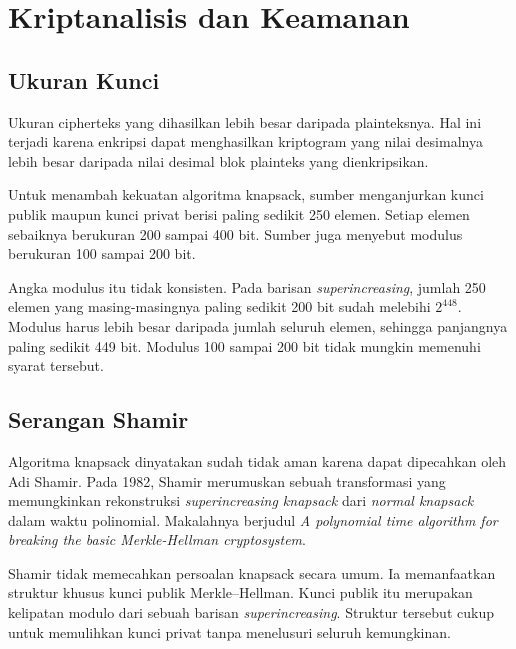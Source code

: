 \section{Kriptanalisis dan Keamanan}
\label{sec:kriptanalisis-knapsack}

\subsection{Ukuran Kunci}

Ukuran cipherteks yang dihasilkan lebih besar daripada plainteksnya. Hal ini
terjadi karena enkripsi dapat menghasilkan kriptogram yang nilai desimalnya
lebih besar daripada nilai desimal blok plainteks yang dienkripsikan.

Untuk menambah kekuatan algoritma knapsack, sumber menganjurkan kunci publik
maupun kunci privat berisi paling sedikit 250 elemen. Setiap elemen sebaiknya
berukuran 200 sampai 400 bit. Sumber juga menyebut modulus berukuran 100 sampai
200 bit.

Angka modulus itu tidak konsisten. Pada barisan \textit{superincreasing},
jumlah 250 elemen yang masing-masingnya paling sedikit 200 bit sudah melebihi
$2^{448}$. Modulus harus lebih besar daripada jumlah seluruh elemen, sehingga
panjangnya paling sedikit 449 bit. Modulus 100 sampai 200 bit tidak mungkin
memenuhi syarat tersebut.

\subsection{Serangan Shamir}

Algoritma knapsack dinyatakan sudah tidak aman karena dapat dipecahkan oleh
Adi Shamir. Pada 1982, Shamir merumuskan sebuah transformasi yang memungkinkan
rekonstruksi \textit{superincreasing knapsack} dari \textit{normal knapsack}
dalam waktu polinomial. Makalahnya berjudul \textit{A polynomial time algorithm
for breaking the basic Merkle-Hellman cryptosystem}.

Shamir tidak memecahkan persoalan knapsack secara umum. Ia memanfaatkan struktur
khusus kunci publik Merkle--Hellman. Kunci publik itu merupakan kelipatan
modulo dari sebuah barisan \textit{superincreasing}. Struktur tersebut cukup
untuk memulihkan kunci privat tanpa menelusuri seluruh kemungkinan.
